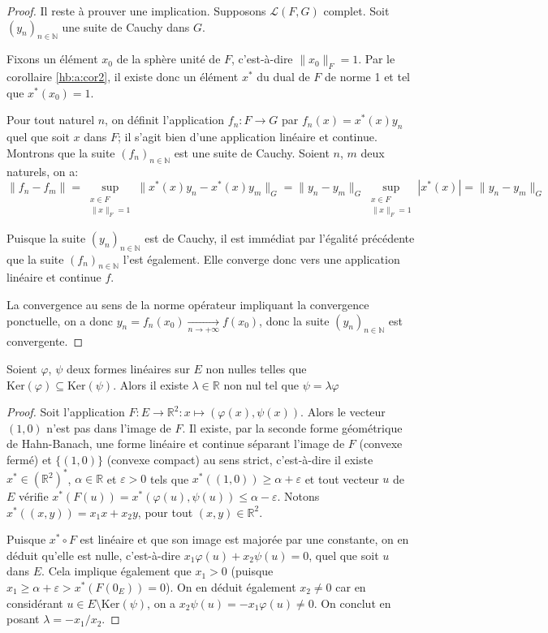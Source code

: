 \begin{proof}
  Il reste à prouver une implication. Supposons $\mathscr{L}(F, G)$ complet.
  Soit $(y_n)_{n\in\mathbb{N}}$ une suite de Cauchy dans $G$.

  Fixons un élément $x_0$ de la sphère unité de $F$, c'est-à-dire
  $\|x_0\|_F = 1$. Par le corollaire \ref{hb:a:cor2}, il existe
  donc un élément $x^*$ du dual de $F$ de norme 1 et tel que $x^*(x_0) = 1$.

  Pour tout naturel $n$, on définit l'application $f_n: F\to G$
  par $f_n(x) = x^*(x)y_n$ quel que soit $x$ dans $F$;
  il s'agit bien d'une application linéaire
  et continue. Montrons que la suite $(f_n)_{n\in\mathbb{N}}$ est une suite
  de Cauchy. Soient $n$, $m$ deux naturels, on a:
  $$\|f_n-f_m\| =
  \sup_{\substack{x\in F\\\|x\|_F = 1}}\|x^*(x)y_n - x^*(x)y_m\|_G =
  \|y_n - y_m\|_G \sup_{\substack{x\in F\\\|x\|_F = 1}} |x^*(x)| =
  \|y_n - y_m\|_G $$

  Puisque la suite $(y_n)_{n\in\mathbb{N}}$ est de Cauchy, il est immédiat
  par l'égalité précédente que la suite $(f_n)_{n\in\mathbb{N}}$ l'est
  également. Elle converge donc vers une application linéaire et continue
  $f$.

  La convergence au sens de la norme opérateur impliquant la
  convergence ponctuelle, on a donc
  $y_n = f_n(x_0)\xrightarrow[n\to+\infty]{} f(x_0)$, donc
  la suite $(y_n)_{n\in\mathbb{N}}$ est convergente.

\end{proof}

\begin{prop}\label{ker:sub:mult}
  Soient $\varphi$, $\psi$ deux formes linéaires sur $E$ non nulles telles
  que $\mathrm{Ker}(\varphi) \subseteq \mathrm{Ker}(\psi)$. Alors
  il existe $\lambda \in\mathbb{R}$ non nul tel que $\psi = \lambda \varphi$
\end{prop}

\begin{proof}
  Soit l'application $F: E \to \mathbb{R}^2: x\mapsto (\varphi(x), \psi(x))$.
  Alors le vecteur $(1, 0)$ n'est pas dans l'image de $F$. Il existe,
  par la seconde forme géométrique de Hahn-Banach, une forme linéaire
  et continue séparant l'image de $F$ (convexe fermé) et $\{(1, 0)\}$ (convexe
  compact) au sens strict, c'est-à-dire il existe $x^*\in (\mathbb{R}^2)^*$,
  $\alpha\in\mathbb{R}$ et $\varepsilon > 0$ tels que $x^*((1, 0))\geq
  \alpha +\varepsilon$ et tout vecteur $u$ de $E$ vérifie
  $x^*(F(u)) = x^*(\varphi(u), \psi(u))\leq \alpha-\varepsilon$.
  Notons
  $x^*((x, y)) = x_1 x + x_2 y$, pour tout $(x, y)\in\mathbb{R}^2$.

  Puisque $x^*\circ F$ est linéaire et que son image est majorée par une
  constante, on en déduit qu'elle est nulle, c'est-à-dire $x_1 \varphi(u) +
  x_2 \psi(u) = 0$, quel que soit $u$ dans $E$.
  Cela implique également que $x_1 > 0$ (puisque $x_1 \geq
  \alpha + \varepsilon > x^*(F(0_E)) = 0$).
  On en déduit également $x_2\neq 0$ car en considérant $u\in E\setminus
  \mathrm{Ker}(\psi)$, on a $x_2 \psi(u) = -x_1\varphi(u) \neq 0 $.
On conclut en posant $\lambda = -x_1/x_2$.
\end{proof}

